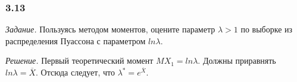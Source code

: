 \subsubsection*{3.13}

\textit{Задание.}
Пользуясь методом моментов,
оцените параметр $ \lambda > 1$ по выборке из распределения Пуассона с параметром $ln \lambda $.

\textit{Решение.} Первый теоретический момент $MX_1 = ln \lambda $.
Должны приравнять $ln \lambda = \overline{X}$.
Отсюда следует, что $ \lambda^* = e^{ \overline{X}}$.
